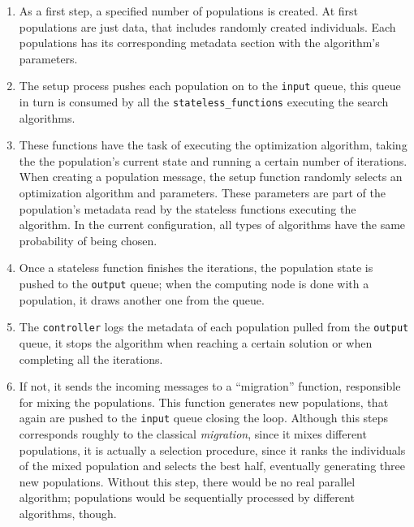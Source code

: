 \documentclass[runningheads]{llncs}
\begin{document}
\begin{enumerate}

\item As a first step, a specified number of populations is created. 
At first populations are just data, that includes randomly created individuals.
Each populations has its corresponding metadata section with the algorithm's parameters.

\item The setup process pushes each population on to the \texttt{input}
queue, this queue in turn is consumed by all the \texttt{stateless\_functions} executing 
the search algorithms.

\item These functions have the task of executing the optimization algorithm, taking the 
the population's current state and running a certain number of iterations.
When creating a population message, the setup function randomly
selects an optimization algorithm and parameters. These parameters
are part of the population's metadata read by the stateless
functions executing the algorithm. In the current configuration, all
types of algorithms have the same probability of being chosen.

\item Once a stateless function finishes the iterations, the population state 
 is pushed to the \texttt{output} queue; when the computing node is done with a population, it draws another one from the
queue.

\item The \texttt{controller} logs the metadata of each population
pulled from the \texttt{output} queue, it stops the algorithm when reaching 
a certain solution or when completing all the iterations.

\item If not, it sends the incoming messages to a ``migration'' function,
  responsible for mixing the populations. This function generates new populations,
  that again are pushed to the \texttt{input} queue closing the loop.
  Although this steps corresponds roughly to the classical
{\em migration}, since it mixes different populations, it is actually
a selection procedure, since it ranks the individuals of the mixed
population and selects the best half,
eventually generating three new populations. Without this step, there
would be no real parallel algorithm; populations would be sequentially
processed by different algorithms, though.

\end{enumerate}
\end{document}
